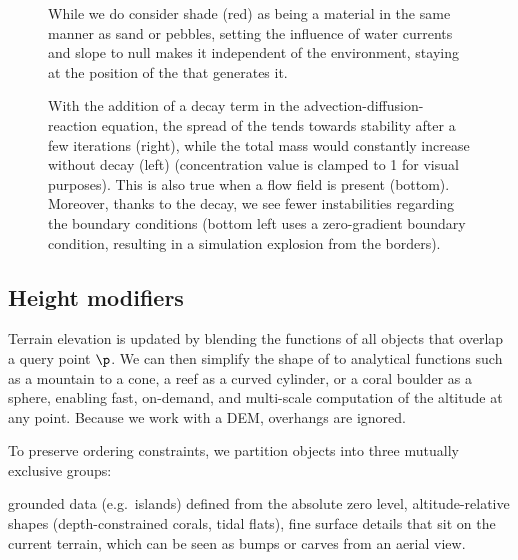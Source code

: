 \begin{figure}
    \caption{While we do consider shade (red) as being a material in the same manner as sand or pebbles, setting the influence of water currents and slope to null makes it independent of the environment, staying at the position of the  that generates it.}
    \label{fig:env-obj-shade}
\end{figure}

\begin{figure}[H]
    \caption{With the addition of a decay term in the advection-diffusion-reaction equation, the spread of the  tends towards stability after a few iterations (right), while the total mass would constantly increase without decay (left) (concentration value is clamped to 1 for visual purposes). This is also true when a flow field is present (bottom). Moreover, thanks to the decay, we see fewer instabilities regarding the boundary conditions (bottom left uses a zero-gradient boundary condition, resulting in a simulation explosion from the borders).}
    \label{fig:env-obj-stability-examples}
\end{figure}

\subsection{Height modifiers}

Terrain elevation is updated by blending the  functions of all objects that overlap a query point $\p$. We can then simplify the shape of  to analytical functions such as a mountain to a cone, a reef as a curved cylinder, or a coral boulder as a sphere, enabling fast, on-demand, and multi-scale computation of the altitude at any point. Because we work with a DEM, overhangs are ignored.

To preserve ordering constraints, we partition objects into three mutually exclusive groups:
\begin{Itemize}
    \Item{$\groundedHeight$} grounded data (e.g.\ islands) defined from the absolute zero level,
    \Item{$\altitudeHeight$} altitude-relative shapes (depth-constrained corals, tidal flats),
    \Item{$\surfaceHeight$} fine surface details that sit on the current terrain, which can be seen as bumps or carves from an aerial view.
\end{Itemize}

